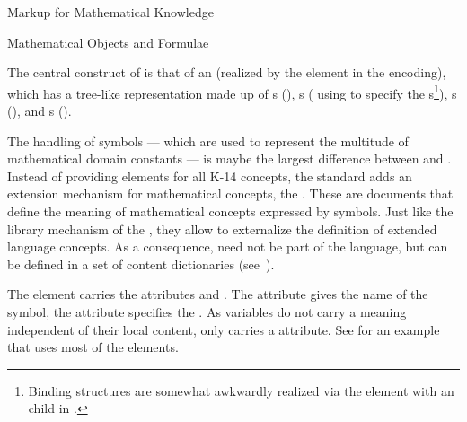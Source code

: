 \begin{omgroup}[id=math-markup]{Markup for Mathematical Knowledge}
\begin{omgroup}[id=math-objects]{Mathematical Objects and Formulae}
\begin{omgroup}[id=math-markup:openmath]{\openmath}
  The central construct of {\openmath} is that of an {}
  (realized by the element {} in the {\xml} encoding), which has
  a tree-like representation made up of {s}
  ({}), {s}
  ({} using {} to specify the
  {s}\footnote{Binding structures are somewhat awkwardly realized
    via the {} element with an {} child
    in {\cmathml}.}), {s} ({}), and
  {s} ({}). 

  The handling of symbols --- which are used to represent the multitude of mathematical
  domain constants --- is maybe the largest difference between {\openmath} and {\cmathml}.
  Instead of providing elements for all K-14 concepts, the {\openmath} standard adds an
  extension mechanism for mathematical concepts, the {\emph{}}.  These are {}
    documents that define the meaning of mathematical concepts expressed by {\openmath}
    symbols.  Just like the library mechanism of the
    {}, they allow {\openmath} to externalize the
    definition of extended language concepts. As a consequence, {} need not
    be part of the {\openmath} language, but can be defined in a set of content
    dictionaries (see~\cite{URL:omcd-core}).

  The {} element carries the attributes {} and
  {}.  The {} attribute gives the name of the
  symbol, the {} attribute specifies the {}. As variables do not carry a meaning independent of their local
  content, {} only carries a {}
  attribute. See {} for an example that uses most of the elements.


\end{omgroup}
\end{omgroup}
\end{omgroup}
